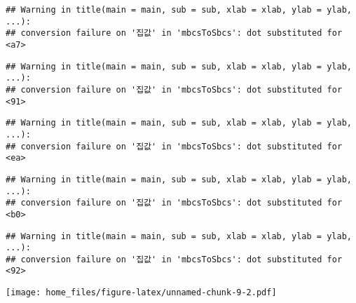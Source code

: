\documentclass[
]{article}
\begin{document}
\begin{verbatim}
## Warning in title(main = main, sub = sub, xlab = xlab, ylab = ylab, ...):
## conversion failure on '집값' in 'mbcsToSbcs': dot substituted for <a7>
\end{verbatim}

\begin{verbatim}
## Warning in title(main = main, sub = sub, xlab = xlab, ylab = ylab, ...):
## conversion failure on '집값' in 'mbcsToSbcs': dot substituted for <91>
\end{verbatim}

\begin{verbatim}
## Warning in title(main = main, sub = sub, xlab = xlab, ylab = ylab, ...):
## conversion failure on '집값' in 'mbcsToSbcs': dot substituted for <ea>
\end{verbatim}

\begin{verbatim}
## Warning in title(main = main, sub = sub, xlab = xlab, ylab = ylab, ...):
## conversion failure on '집값' in 'mbcsToSbcs': dot substituted for <b0>
\end{verbatim}

\begin{verbatim}
## Warning in title(main = main, sub = sub, xlab = xlab, ylab = ylab, ...):
## conversion failure on '집값' in 'mbcsToSbcs': dot substituted for <92>
\end{verbatim}

\texttt{[image: home\_files/figure-latex/unnamed-chunk-9-2.pdf]}
\end{document}
